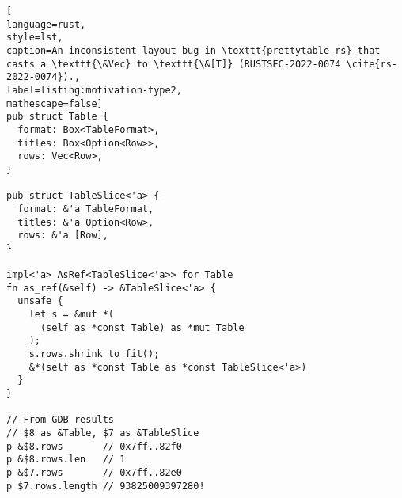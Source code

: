 \begin{lstlisting}[
language=rust, 
style=lst,
caption=An inconsistent layout bug in \texttt{prettytable-rs} that casts a \texttt{\&Vec} to \texttt{\&[T]} (RUSTSEC-2022-0074 \cite{rs-2022-0074}).,
label=listing:motivation-type2,
mathescape=false]
pub struct Table {
  format: Box<TableFormat>,
  titles: Box<Option<Row>>,
  rows: Vec<Row>,
}

pub struct TableSlice<'a> {
  format: &'a TableFormat,
  titles: &'a Option<Row>,
  rows: &'a [Row],
}

impl<'a> AsRef<TableSlice<'a>> for Table
fn as_ref(&self) -> &TableSlice<'a> {
  unsafe {
    let s = &mut *(
      (self as *const Table) as *mut Table
    );
    s.rows.shrink_to_fit();
    &*(self as *const Table as *const TableSlice<'a>)
  }
}

// From GDB results
// $8 as &Table, $7 as &TableSlice
p &$8.rows       // 0x7ff..82f0
p &$8.rows.len   // 1
p &$7.rows       // 0x7ff..82e0
p $7.rows.length // 93825009397280!
\end{lstlisting}







